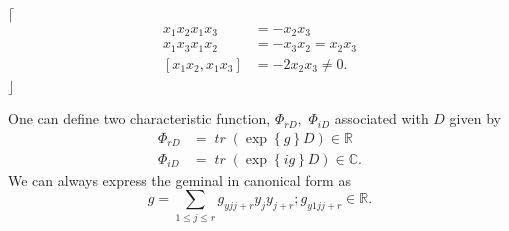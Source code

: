 \documentclass[aps,preprint]{revtex4}%
\begin{document}
$\lceil$
\begin{align}
x_{1}x_{2}x_{1}x_{3}  & =-x_{2}x_{3}\\
x_{1}x_{3}x_{1}x_{2}  & =-x_{3}x_{2}=x_{2}x_{3}\\
\left[  x_{1}x_{2},x_{1}x_{3}\right]    & =-2x_{2}x_{3}\neq0.
\end{align}
$\rfloor$ 

One can define two characteristic function, $\Phi_{rD},$ $\Phi_{iD}$
associated with $D$ given by
\begin{align}
\Phi_{rD} &  =\mathit{\operatorname*{tr}}\left(  \exp\left\{  g\right\}
D\right)  \in\mathbb{R}\\
\Phi_{iD} &  =\mathit{\operatorname*{tr}}\left(  \exp\left\{  ig\right\}
D\right)  \in\mathbb{C}.
\end{align}
We can always express the geminal in canonical form as
\begin{equation}
g=%
{\textstyle\sum\limits_{1\leq j\leq r}}
\mathit{g}_{yjj+r}y_{j}y_{j+r};\mathit{g}_{y1jj+r}\in\mathbb{R}.
\end{equation}
\end{document}
